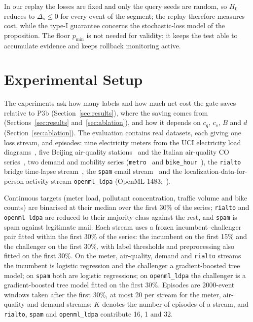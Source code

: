 \documentclass[10pt]{article}
\begin{document}
In our replay the losses are fixed and only the query seeds are random, so $H_0$ reduces to
$\Delta_s\le0$ for every event of the segment; the replay therefore measures cost, while the
type-I guarantee concerns the stochastic-loss model of the proposition. The floor $p_{\min}$ is not needed for validity; it
keeps the test able to accumulate evidence and keeps rollback monitoring active.

\section{Experimental Setup}\label{sec:setup}
The experiments ask how many labels and how much net cost the gate saves relative to \textsf{P3b}
(Section~\ref{sec:results}), where the saving comes from (Sections~\ref{sec:results}
and~\ref{sec:ablation}), and how it depends on $c_q$, $c_s$, $B$ and $d$
(Section~\ref{sec:ablation}). The evaluation contains \NStreams{} real datasets, each giving one loss stream, and \NEpisodes{}
episodes: nine electricity meters from the UCI electricity load diagrams~\citep{trindade2015electricity},
five Beijing air-quality stations~\citep{zhang2017cautionary} and the Italian air-quality CO
series~\citep{devito2008field}, two demand and mobility series (\texttt{metro}~\citep{hogue2019metro}
and \texttt{bike\_hour}~\citep{fanaee2014event}), the \texttt{rialto} bridge time-lapse
stream~\citep{losing2016knn}, the \texttt{spam} email stream~\citep{katakis2010tracking} and the
localization-data-for-person-activity stream \texttt{openml\_ldpa} (OpenML
1483;~\citealp{kaluza2010agent}).

Continuous targets (meter load, pollutant concentration, traffic volume and bike counts) are
binarised at their median over the first 30\% of the series; \texttt{rialto} and
\texttt{openml\_ldpa} are reduced to their majority class against the rest, and \texttt{spam} is
spam against legitimate mail. Each stream uses a frozen incumbent--challenger pair fitted within the
first 30\% of the series: the incumbent on the first 15\% and the challenger on the first 30\%, with
label thresholds and preprocessing also fitted on the first 30\%. On the meter,
air-quality, demand and \texttt{rialto} streams the incumbent is logistic regression and the
challenger a gradient-boosted tree model; on \texttt{spam} both are logistic regressions; on
\texttt{openml\_ldpa} the challenger is a gradient-boosted tree model fitted on the first 30\%. Episodes are
2000-event windows taken after the first 30\%, at most 20 per stream for the meter, air-quality and
demand streams; $K$ denotes the
number of episodes of a stream, and \texttt{rialto}, \texttt{spam} and \texttt{openml\_ldpa}
contribute 16, 1 and 32.
\end{document}
